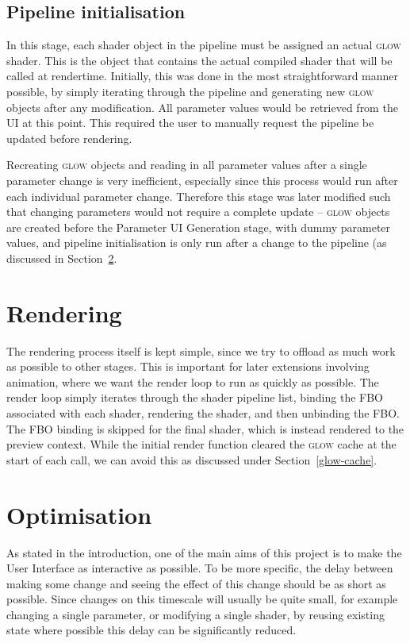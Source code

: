 \documentclass[12pt,twoside,notitlepage]{report}
\begin{document}
\subsection*{Pipeline initialisation}
\label{pipe-init}
In this stage, each shader object in the pipeline must be assigned an actual \textsc{glow} shader. This is the object that contains the actual compiled shader that will be called at rendertime. Initially, this was done in the most straightforward manner possible, by simply iterating through the pipeline and generating new \textsc{glow} objects after any modification. All parameter values would be retrieved from the UI at this point. This required the user to manually request the pipeline be updated before rendering. 

Recreating \textsc{glow} objects and reading in all parameter values after a single parameter change is very inefficient, especially since this process would run after each individual parameter change. Therefore this stage was later modified such that changing parameters would not require a complete update -- \textsc{glow} objects are created before the Parameter UI Generation stage, with dummy parameter values, and pipeline initialisation is only run after a change to the pipeline (as discussed in Section~\ref{opt}.

\section{Rendering}
The rendering process itself is kept simple, since we try to offload as much work as possible to other stages. This is important for later extensions involving animation, where we want the render loop to run as quickly as possible. The render loop simply iterates through the shader pipeline list, binding the FBO associated with each shader, rendering the shader, and then unbinding the FBO. The FBO binding is skipped for the final shader, which is instead rendered to the preview context. While the initial render function cleared the \textsc{glow} cache at the start of each call, we can avoid this as discussed under Section~\ref{glow-cache}.

\section{Optimisation}
\label{opt}
As stated in the introduction, one of the main aims of this project is to make the User Interface as interactive as possible. To be more specific, the delay between making some change and seeing the effect of this change should be as short as possible. Since changes on this timescale will usually be quite small, for example changing a single parameter, or modifying a single shader, by reusing existing state where possible this delay can be significantly reduced.
\end{document}
